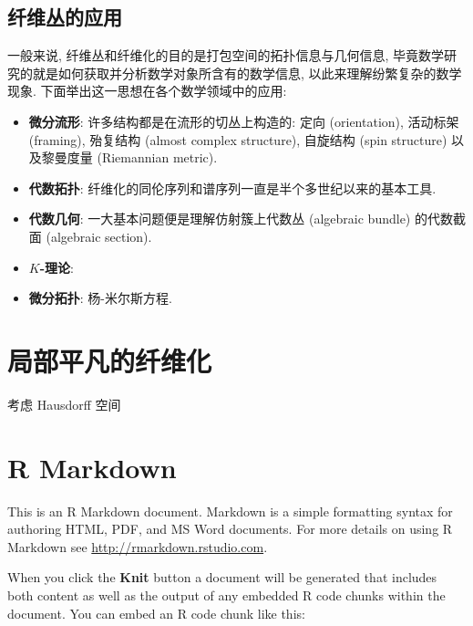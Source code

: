 \documentclass[
  lang=cn,
  titlestyle=hang,
  chinesefont=ctexfont]{elegantbook}
\providecommand{\tightlist}{%
  \setlength{\itemsep}{0pt}\setlength{\parskip}{0pt}}
\begin{document}
\hypertarget{ux7ea4ux7ef4ux4e1bux7684ux5e94ux7528}{%
\section*{纤维丛的应用}\label{ux7ea4ux7ef4ux4e1bux7684ux5e94ux7528}}

一般来说, 纤维丛和纤维化的目的是打包空间的拓扑信息与几何信息, 毕竟数学研究的就是如何获取并分析数学对象所含有的数学信息, 以此来理解纷繁复杂的数学现象. 下面举出这一思想在各个数学领域中的应用:

\begin{itemize}
\tightlist
\item
  \textbf{微分流形}: 许多结构都是在流形的切丛上构造的: 定向 (orientation), 活动标架 (framing), 殆复结构 (almost complex structure), 自旋结构 (spin structure) 以及黎曼度量 (Riemannian metric).
\item
  \textbf{代数拓扑}: 纤维化的同伦序列和谱序列一直是半个多世纪以来的基本工具.
\item
  \textbf{代数几何}: 一大基本问题便是理解仿射簇上代数丛 (algebraic bundle) 的代数截面 (algebraic section).
\item
  \textbf{\(K\)-理论}:
\item
  \textbf{微分拓扑}: 杨-米尔斯方程.
\end{itemize}

\hypertarget{locally-trivial-fibrations}{%
\chapter{局部平凡的纤维化}\label{locally-trivial-fibrations}}

考虑 Hausdorff 空间

\hypertarget{appendix}{%
\appendix}


\hypertarget{r-markdown}{%
\chapter{R Markdown}\label{r-markdown}}

This is an R Markdown document. Markdown is a simple formatting syntax for authoring HTML, PDF, and MS Word documents. For more details on using R Markdown see \url{http://rmarkdown.rstudio.com}.

When you click the \textbf{Knit} button a document will be generated that includes both content as well as the output of any embedded R code chunks within the document. You can embed an R code chunk like this:
\end{document}
